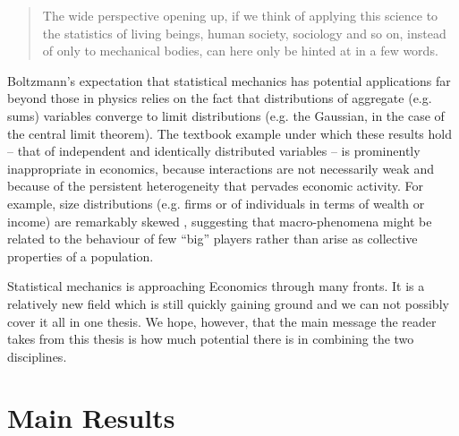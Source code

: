 \begin{quote}
The wide perspective opening up, if we think of applying this science
to the statistics of living beings, human society, sociology and so
on, instead of only to mechanical bodies, can here only be hinted at
in a few words. \cite{Boltzmann}
\end{quote}


Boltzmann's expectation that statistical mechanics has potential applications far beyond those in physics relies on the fact that distributions of aggregate (e.g. sums) variables converge to limit distributions (e.g. the Gaussian, in the case of the central limit theorem).  The textbook example under which these results hold -- that of independent and identically distributed variables -- is prominently inappropriate in economics, because interactions are not necessarily weak and because of the persistent heterogeneity that pervades economic activity. For example, size distributions (e.g. firms or of individuals in terms of wealth or income) are remarkably skewed \cite{firm-sizes, firm-sizes2, wealth-inequality, wealth-inequality2}, suggesting that macro-phenomena might be related to the behaviour of few ``big'' players rather than arise as collective properties of a population.

Statistical mechanics is approaching Economics through many fronts. It is a relatively new field which is still quickly gaining ground and we can not possibly cover it all in one thesis. We hope, however, that the main message the reader takes from this thesis is how much potential there is in combining the two disciplines.

\section{Main Results}

